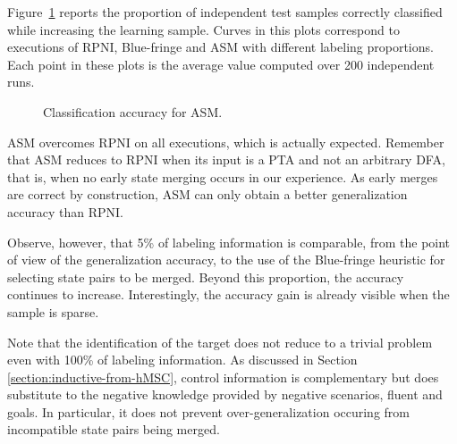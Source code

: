 Figure~\ref{image:evaluation-asm-accuracy} reports the proportion of independent test samples correctly classified while increasing the learning sample. Curves in this plots correspond to executions of RPNI, Blue-fringe and ASM with different labeling proportions. Each point in these plots is the average value computed over 200 independent runs. 

\begin{figure}
\begin{center}
\caption{Classification accuracy for ASM\label{image:evaluation-asm-accuracy}.}
\end{center}
\end{figure}

ASM overcomes RPNI on all executions, which is actually expected. Remember that ASM reduces to RPNI when its input is a PTA and not an arbitrary DFA, that is, when no early state merging occurs in our experience. As early merges are correct by construction, ASM can only obtain a better generalization accuracy than RPNI.

Observe, however, that 5\% of labeling information is comparable, from the point of view of the generalization accuracy, to the use of the Blue-fringe heuristic for selecting state pairs to be merged. Beyond this proportion, the accuracy continues to increase. Interestingly, the accuracy gain is already visible when the sample is sparse.

Note that the identification of the target does not reduce to a trivial problem even with 100\% of labeling information. As discussed in Section \ref{section:inductive-from-hMSC}, control information is complementary but does substitute to the negative knowledge provided by negative scenarios, fluent and goals. In particular, it does not prevent over-generalization occuring from incompatible state pairs being merged. 
